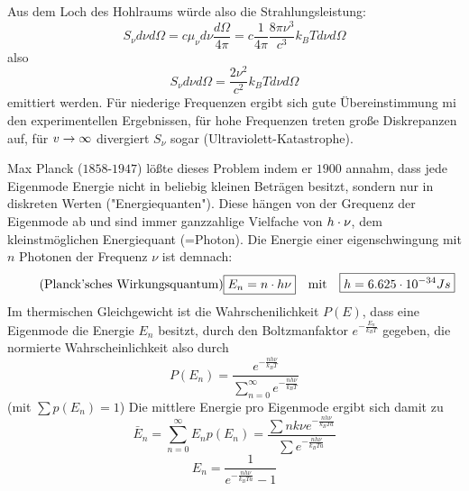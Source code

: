 Aus dem Loch des Hohlraums würde also die Strahlungsleistung:
\begin{equation*}
    S_{\nu} d\nu d\Omega 
    =
    c \mu_{\nu} d\nu \frac{d\Omega}{4\pi}
    =
    c \frac{1}{4\pi} \frac{8\pi\nu^3}{c^3}k_B T d\nu d\Omega
\end{equation*}
also
\begin{equation*}
    \boxed{
    S_{\nu} d\nu d\Omega 
    =
    \frac{2\nu^2}{c^2} k_B T d\nu d\Omega
    }
\end{equation*}
emittiert werden. Für niederige Frequenzen ergibt sich gute Übereinstimmung mi
den experimentellen Ergebnissen, für hohe Frequenzen treten große Diskrepanzen
auf, für $v\rightarrow \infty$ divergiert $S_{\nu}$ sogar (Ultraviolett-Katastrophe).

Max Planck ($1858$-$1947$) lößte dieses Problem indem er $1900$ annahm, dass
jede Eigenmode Energie nicht in beliebig kleinen Beträgen besitzt, sondern nur
in diskreten Werten ("Energiequanten"). Diese hängen von der Grequenz der
Eigenmode ab und sind immer ganzzahlige Vielfache von $h \cdot \nu$, dem
kleinstmöglichen Energiequant (=Photon). Die Energie einer eigenschwingung mit
$n$ Photonen der Frequenz $\nu$ ist demnach:
\begin{equation*}
    \tag*{(Planck'sches Wirkungsquantum)}
    \boxed{
    E_n = n \cdot h \nu
    }
    \quad
    \text{mit}
    \quad
    \boxed{
        h=6.625 \cdot 10^{-34} Js
    }
\end{equation*}
Im thermischen Gleichgewicht ist die Wahrschenilichkeit $P(E)$, dass eine
Eigenmode die Energie $E_n$ besitzt, durch den Boltzmanfaktor
$e^{-\frac{E_n}{k_B T}}$ gegeben, die normierte Wahrscheinlichkeit also durch
\begin{equation*}
    P(E_n)
    =
    \frac{e^{-\frac{n h \nu}{k_B T}}}{\sum_{n=0}^{\infty}e^{-\frac{n h \nu}{k_B T}}}
\end{equation*}
(mit $\sum p(E_n) =1$)
Die mittlere Energie pro Eigenmode ergibt sich damit zu
\begin{equation*}
    \bar{E}_n
    =
    \sum_{n=0}^{\infty} E_n p(E_n)
    =
    \frac{\sum n k \nu e^{-\frac{nh\nu}{k_B Ta}}}{\sum e^{-\frac{nh\nu}{k_B Ta}}}
\end{equation*}
\begin{equation*}
    E_n = \frac{1}{e^{-\frac{nh\nu}{k_B Ta}}-1}
\end{equation*}
